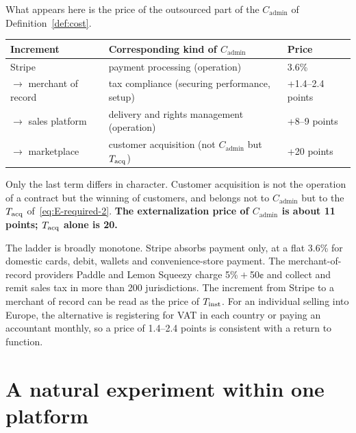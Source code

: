 \begin{remark}
\label{rem:ladder-is-cadmin}
What appears here is the price of the outsourced part of the $C_{\mathrm{admin}}$ of
Definition~\ref{def:cost}.

\begin{center}
\begin{tabularx}{\textwidth}{@{}lXl@{}}
\toprule
Increment & Corresponding kind of $C_{\mathrm{admin}}$ & Price \\
\midrule
Stripe & payment processing (operation) & 3.6\% \\
$\to$ merchant of record & tax compliance (securing performance, setup) & +1.4--2.4 points \\
$\to$ sales platform & delivery and rights management (operation) & +8--9 points \\
$\to$ marketplace & customer acquisition (not $C_{\mathrm{admin}}$ but $T_{\rm acq}$) & +20 points \\
\bottomrule
\end{tabularx}
\label{tab:cadmin-breakdown}
\end{center}

Only the last term differs in character. Customer acquisition is not the operation of a
contract but the winning of customers, and belongs not to $C_{\mathrm{admin}}$ but to the
$T_{\rm acq}$ of~\eqref{eq:E-required-2}.
\textbf{The externalization price of $C_{\mathrm{admin}}$ is about 11 points; $T_{\rm acq}$
alone is 20.}
\end{remark}

The ladder is broadly monotone. Stripe absorbs payment only, at a flat 3.6\% for domestic
cards, debit, wallets and convenience-store payment. The merchant-of-record providers Paddle
and Lemon Squeezy charge 5\%${}+{}$50¢ and collect and remit sales tax in more than 200
jurisdictions. The increment from Stripe to a merchant of record can be read as the price of
$T_{\rm inst}$. For an individual selling into Europe, the alternative is registering for VAT
in each country or paying an accountant monthly, so a price of 1.4--2.4 points is consistent
with a return to function.

\section{A natural experiment within one platform}

